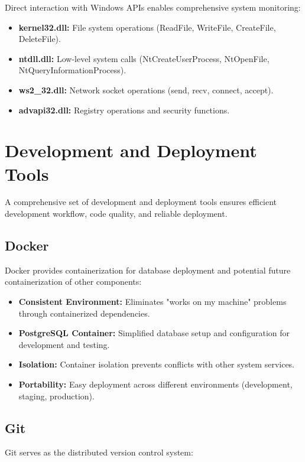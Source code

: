 Direct interaction with Windows APIs enables comprehensive system monitoring:

\begin{itemize}
    \item \textbf{kernel32.dll:} File system operations (ReadFile, WriteFile, CreateFile, DeleteFile).
    \item \textbf{ntdll.dll:} Low-level system calls (NtCreateUserProcess, NtOpenFile, NtQueryInformationProcess).
    \item \textbf{ws2\_32.dll:} Network socket operations (send, recv, connect, accept).
    \item \textbf{advapi32.dll:} Registry operations and security functions.
\end{itemize}

\section{Development and Deployment Tools}

A comprehensive set of development and deployment tools ensures efficient development workflow, code quality, and reliable deployment.

\subsection{Docker}

Docker provides containerization for database deployment and potential future containerization of other components:

\begin{itemize}
    \item \textbf{Consistent Environment:} Eliminates "works on my machine" problems through containerized dependencies.
    \item \textbf{PostgreSQL Container:} Simplified database setup and configuration for development and testing.
    \item \textbf{Isolation:} Container isolation prevents conflicts with other system services.
    \item \textbf{Portability:} Easy deployment across different environments (development, staging, production).
\end{itemize}

\subsection{Git}

Git serves as the distributed version control system:

